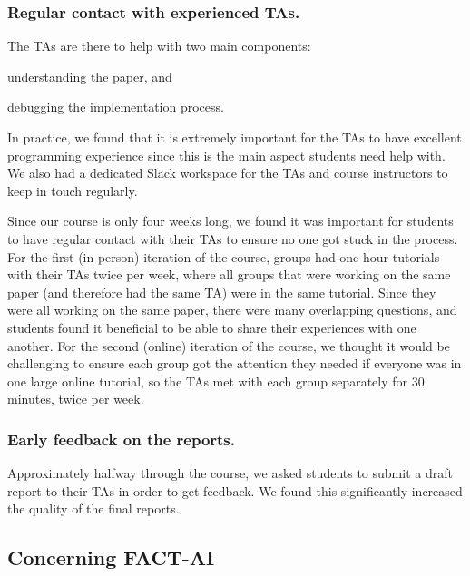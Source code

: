 \documentclass[letterpaper]{article}
\begin{document}
\subsubsection{Regular contact with experienced TAs.}
The TAs are there to help with two main components: 
\begin{enumerate*}[label=(\roman*)]
\item understanding the paper, and 
\item debugging the implementation process. 
\end{enumerate*}
In practice, we found that it is extremely important for the TAs to have excellent programming experience since this is the main aspect students need help with. 
We also had a dedicated Slack workspace for the TAs and course instructors to keep in touch regularly. 

Since our course is only four weeks long, we found it was important for students to have regular contact with their TAs to ensure no one got stuck in the process. 
For the first (in-person) iteration of the course, groups had one-hour tutorials with their TAs twice per week, where all groups that were working on the same paper (and therefore had the same TA) were in the same tutorial. 
Since they were all working on the same paper, there were many overlapping questions, and students found it beneficial to be able to share their experiences with one another. 
For the second (online) iteration of the course, we thought it would be challenging to ensure each group got the attention they needed if everyone was in one large online tutorial, so the TAs met with each group separately for 30 minutes, twice per week. 

\subsubsection{Early feedback on the reports.}
Approximately halfway through the course, we asked students to submit a draft report to their TAs in order to get feedback. We found this significantly increased the quality of the final reports. 

\subsection{Concerning FACT-AI}
\end{document}

